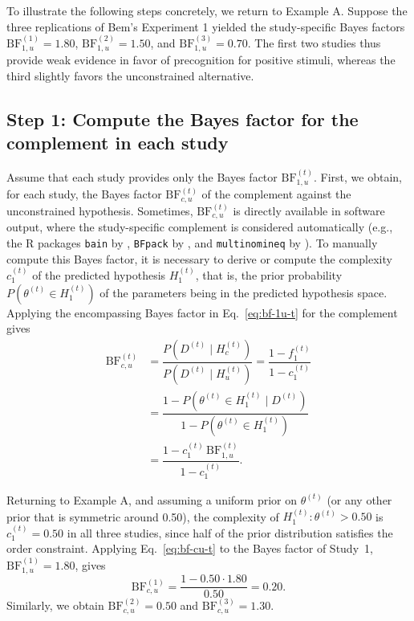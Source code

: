 \documentclass[letterpaper,11pt,oneside]{article}
\begin{document}
To illustrate the following steps concretely, we return to Example A. Suppose the three replications of Bem's Experiment 1 yielded the study-specific Bayes factors $\mathrm{BF}_{1,u}^{(1)} = 1.80$, $\mathrm{BF}_{1,u}^{(2)} = 1.50$, and
$\mathrm{BF}_{1,u}^{(3)} = 0.70$.%
The first two studies thus provide weak evidence in favor of precognition for positive stimuli, whereas the third slightly favors the
unconstrained alternative.

\subsection{Step 1: Compute the Bayes factor for the complement in each study}
\label{sec:step-1-compute-bf-c-u-t}

Assume that each study provides only the Bayes factor $\mathrm{BF}_{1,u}^{(t)}$. First, we obtain, for each study, the Bayes factor $\mathrm{BF}_{c,u}^{(t)}$ of the complement against the unconstrained hypothesis. Sometimes, $\mathrm{BF}_{c,u}^{(t)}$ is directly available in software output, where the study-specific complement is considered automatically (e.g., the R packages \texttt{bain} by \cite{guBainBayesFactors2024}, \texttt{BFpack} by \cite{mulderBFpackFlexibleBayes2021}, and \texttt{multinomineq} by \cite{heckMultinomineqBayesianInference2019}). To manually compute this Bayes factor, it is necessary to derive or compute the complexity $c_1^{(t)}$ of the predicted hypothesis $H_1^{(t)}$, that is, the prior probability $P\left(\theta^{(t)} \in H_1^{(t)}\right)$ of the parameters being in the predicted hypothesis space. Applying the encompassing Bayes factor in Eq.~\eqref{eq:bf-1u-t} for the complement gives
\begin{align}
\mathrm{BF}_{c,u}^{(t)}
&= \dfrac{P\left(D^{(t)} \mid H_c^{(t)}\right)}
         {P\left(D^{(t)} \mid H_u^{(t)}\right)}
 = \dfrac{1-f_1^{(t)}}{1-c_1^{(t)}} \nonumber \\
&= \dfrac{1-P\left(\theta^{(t)} \in H_1^{(t)} \mid D^{(t)}\right)}
         {1-P\left(\theta^{(t)} \in H_1^{(t)}\right)} \nonumber \\
&= \dfrac{1-c_1^{(t)}\,\mathrm{BF}_{1,u}^{(t)}}{1-c_1^{(t)}}.
\label{eq:bf-cu-t}
\end{align}

Returning to Example A, and assuming a uniform prior on $\theta^{(t)}$ (or any other prior that is symmetric around 0.50), the complexity of $H_1^{(t)}: \theta^{(t)} > 0.50$ is $c_1^{(t)} = 0.50$ in all three studies, since half of the prior distribution satisfies the order constraint. Applying Eq.~\eqref{eq:bf-cu-t} to the Bayes factor of Study~1, $\mathrm{BF}_{1,u}^{(1)} = 1.80$, gives
\[
\mathrm{BF}_{c,u}^{(1)} = \frac{1 - 0.50 \cdot 1.80}{0.50} = 0.20.%
\]
Similarly, we obtain $\mathrm{BF}_{c,u}^{(2)} =0.50$ and $\mathrm{BF}_{c,u}^{(3)} =1.30$.
\end{document}
